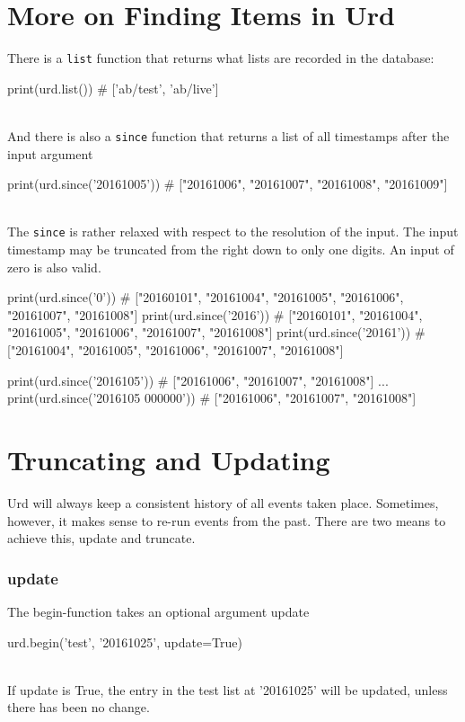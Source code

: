 \section{More on Finding Items in Urd}
There is a \texttt{list} function that returns what lists are recorded
in the database:
\\
\begin{pythonBEG}
  print(urd.list())
  # ['ab/test', 'ab/live']
\end{pythonBEG}
\\
And there is also a \texttt{since} function that returns a list of all
timestamps after the input argument
\\
\begin{pythonMID}
  print(urd.since('20161005'))
  # ["20161006", "20161007", "20161008", "20161009"]
\end{pythonMID}
\\
The \texttt{since} is rather relaxed with respect to the resolution of
the input.  The input timestamp may be truncated from the right down
to only one digits.  An input of zero is also valid.
\\
\begin{pythonEND}
  print(urd.since('0'))
  # ["20160101", "20161004", "20161005", "20161006", "20161007", "20161008"]
  print(urd.since('2016'))
  # ["20160101", "20161004", "20161005", "20161006", "20161007", "20161008"]
  print(urd.since('20161'))
  # ["20161004", "20161005", "20161006", "20161007", "20161008"]

  print(urd.since('2016105'))
  # ["20161006", "20161007", "20161008"]
  ...
  print(urd.since('2016105 000000'))
  # ["20161006", "20161007", "20161008"]
\end{pythonEND}



\section{Truncating and Updating}

Urd will always keep a consistent history of all events taken place.
Sometimes, however, it makes sense to re-run events from the past.
There are two means to achieve this, update and truncate.

\subsubsection{update}
The begin-function takes an optional argument update

\begin{python}
  urd.begin('test', '20161025', update=True)
\end{python}
\\
If update is True, the entry in the test list at '20161025' will be
updated, unless there has been no change.

